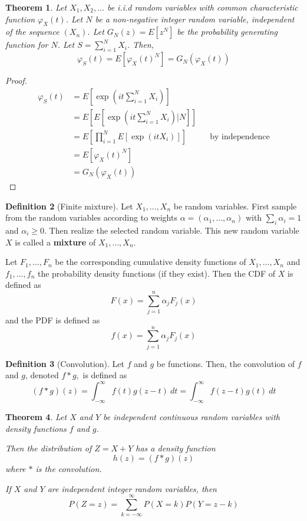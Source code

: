 \documentclass{article}
\theoremstyle{plain}
\newtheorem{theorem}{Theorem}[section]
\theoremstyle{definition}
\newtheorem{defn}[theorem]{Definition}
\theoremstyle{remark}
\numberwithin{equation}{section}
\begin{document}
\begin{theorem}\label{thm:char_func_random_sum}
Let $X_1, X_2, \ldots$ be i.i.d random variables with common characteristic function $\varphi_X(t)$.
Let $N$ be a non-negative integer random variable, independent of the sequence $(X_n)$.
Let $G_N(z) = E[z^N]$ be the probability generating function for $N$.
Let $S = \sum_{i = 1}^N X_i$.
Then,
$$
\varphi_S(t) = E[\varphi_X(t)^N] = G_N(\varphi_X(t))
$$
\end{theorem}

\begin{proof}
\begin{align*}
    \varphi_S(t) &= E[ \exp(it \sum_{i = 1}^N X_i) ]\\
    &= E[ E[ \exp(it \sum_{i = 1}^N X_i) | N ]]\\
    &= E \left[ \prod_{i = 1}^N E[\exp(it X_i)] \right] && \text{by independence}\\
    &= E[\varphi_X(t)^N]\\
    &= G_N(\varphi_X(t))
\end{align*}
\end{proof}

\begin{defn}[Finite mixture]
Let $X_1,\ldots, X_n$ be random variables.
First sample from the random variables according to weights $\alpha = (\alpha_1, \ldots, \alpha_n)$ with $\sum_i \alpha_i = 1$ and $\alpha_i \geq 0$.
Then realize the selected random variable.
This new random variable $X$ is called a \textbf{mixture} of $X_1,\ldots, X_n$.

Let $F_1, \ldots, F_n$ be the corresponding cumulative density functions of $X_1, \ldots, X_n$ and $f_1, \ldots, f_n$ the probability density functions (if they exist).
Then the CDF of $X$ is defined as
$$
F(x) = \sum_{j = 1}^n \alpha_j F_j(x)
$$
and the PDF is defined as
$$
f(x) = \sum_{j = 1}^n \alpha_j F_j(x)
$$
\end{defn}

\begin{defn}[Convolution]
Let $f$ and $g$ be functions. Then, the convolution of $f$ and $g$, denoted $f * g,$ is defined as
$$
(f * g)(z) = \int_{-\infty}^\infty f(t) g(z - t)~dt =  \int_{-\infty}^\infty f(z - t) g(t)~dt
$$
\end{defn}

\begin{theorem}
Let $X$ and $Y$ be independent continuous random variables with density functions $f$ and $g$.

Then the distribution of $Z = X + Y$ has a density function 
$$
h(z) = (f * g)(z)
$$
where $*$ is the convolution.

If $X$ and $Y$ are independent integer random variables, then
$$
P(Z = z) = \sum_{k = -\infty}^\infty P(X = k) P(Y = z - k)
$$
\end{theorem}
\end{document}
